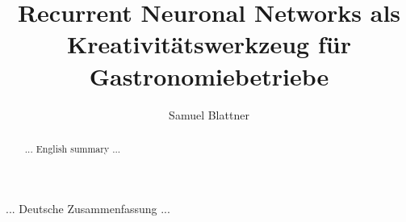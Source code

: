 \documentclass{ffhsthesis}
\begin{document}
    \title{Recurrent Neuronal Networks als Kreativitätswerkzeug für Gastronomiebetriebe}
    \author{Samuel Blattner}


    \maketitle

    \begin{zusammenfassung}
        ... Deutsche Zusammenfassung ...
    \end{zusammenfassung}

    \begin{abstract}
        ... English summary ...
    \end{abstract}

    \tableofcontents

    \startThesis %

    
    
    
    

    
    
\end{document}
